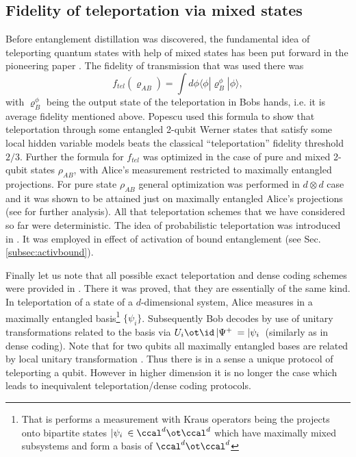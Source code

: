 \documentclass[rmp,12pt,preprint]{revtex4-2}
\begin{document}
\subsection{Fidelity of teleportation via mixed states}
Before entanglement distillation was discovered,
the fundamental idea of teleporting quantum states with help of
mixed states has been put forward in the pioneering paper \cite{Popescu1}.
The fidelity of transmission that
was used there was
\begin{equation}
f_{tel}(\varrho_{AB})=\int d \phi \langle \phi|\varrho^{\phi}_{B}
|\phi \rangle,
\end{equation}
with $\varrho^{\phi}_{B}$ being the output state of the
teleportation in Bobs hands, i.e. it is average fidelity mentioned
above. Popescu used this formula to show that teleportation through
some entangled 2-qubit Werner states that satisfy some local hidden
variable models \cite{Werner1989} beats the classical
``teleportation'' fidelity threshold $2/3$. Further the formula for
$f_{tel}$ was optimized in the case of pure
\cite{GisinTeleportation} and mixed \cite{HHH1996-teleportation}
2-qubit states $\rho_{AB}$, with Alice's measurement restricted to
maximally entangled projections. For pure state $\rho_{AB}$ general
optimization was performed in $d \otimes d$ case and it was shown
to be attained just on maximally entangled Alice's projections
\cite{BanaszekTeleportation}(see \cite{BowenBoseTeleportation} for
further analysis). All that teleportation schemes that we have considered so far were deterministic. The idea of probabilistic teleportation was introduced in \cite{MorTelepovm,BrassardHorodeckiMorTeleportation}. It was employed in effect of activation of bound entanglement (see Sec. \ref{subsec:activbound}).

Finally let us note that all possible
exact teleportation and dense coding schemes were provided in
\cite{werner-alltel}. There it was proved, that they are essentially
of the same kind.  In teleportation of a state of a $d$-dimensional system, Alice measures in a maximally entangled basis\footnote{ That is performs a measurement with Kraus operators being the projects onto bipartite states $|\psi_i\>\in \ccal^d\ot\ccal^d$ which have maximally mixed subsystems and form a basis of $\ccal^d\ot\ccal^d$} $\{\psi_i\}$. Subsequently Bob decodes by use of unitary transformations related to the basis via $U_i\ot \id \, |\Psi^+\> =|\psi_i\>$ (similarly as in dense coding).
Note that for two qubits all maximally entangled bases are related by local unitary
transformation \cite{MRH-PRA96}. Thus there is in a sense a unique protocol
of teleporting a qubit.  However in higher dimension it is no longer the case  \cite{WojcikGC2003-Bell-bases} which leads to inequivalent teleportation/dense coding protocols.
\end{document}
